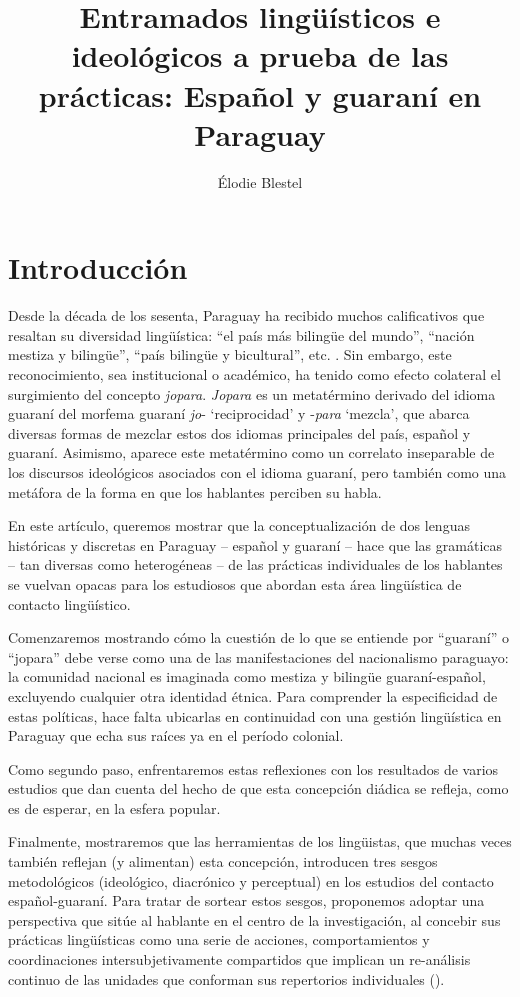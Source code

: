 \documentclass[output=paper]{langscibook}
\author{Élodie Blestel\orcid{0000-0001-7257-6859}\affiliation{Université Sorbonne Nouvelle}}
\title{Entramados lingüísticos e ideológicos a prueba de las prácticas: Español y guaraní en Paraguay}
\begin{document}
\maketitle 
{}%



\section{Introducción}


Desde la década de los sesenta, Paraguay ha recibido muchos calificativos que resaltan su diversidad lingüística: “el país más bilingüe del mundo”, “nación mestiza y bilingüe”, “país bilingüe y bicultural”, etc. \citep{Penner2014}. Sin embargo, este reconocimiento, sea institucional o académico, ha tenido como efecto colateral el surgimiento del concepto \emph {jopara}. \textit{Jopara} es un metatérmino derivado del idioma guaraní del morfema guaraní \textit{jo}{}- ‘reciprocidad’ y -\textit{para} ‘mezcla’, que abarca diversas formas de mezclar estos dos idiomas principales del país, español y guaraní. Asimismo, aparece este metatérmino como un correlato inseparable de los discursos ideológicos asociados con el idioma guaraní, pero también como una metáfora de la forma en que los hablantes perciben su habla.

En este artículo, queremos mostrar que la conceptualización de dos lenguas históricas y discretas en Paraguay -- español y guaraní -- hace que las gramáticas -- tan diversas como heterogéneas -- de las prácticas individuales de los hablantes se vuelvan opacas para los estudiosos que abordan esta área lingüística de contacto lingüístico.

Comenzaremos mostrando cómo la cuestión de lo que se entiende por “guaraní” o “jopara” debe verse como una de las manifestaciones del nacionalismo paraguayo: la comunidad nacional es imaginada como mestiza y bilingüe guaraní-español, excluyendo cualquier otra identidad étnica. Para comprender la especificidad de estas políticas, hace falta ubicarlas en continuidad con una gestión lingüística en Paraguay que echa sus raíces ya en el período colonial.

Como segundo paso, enfrentaremos estas reflexiones con los resultados de varios estudios que dan cuenta del hecho de que esta concepción diádica se refleja, como es de esperar, en la esfera popular.

Finalmente, mostraremos que las herramientas de los lingüistas, que muchas veces también reflejan (y alimentan) esta concepción, introducen tres sesgos metodológicos (ideológico, diacrónico y perceptual) en los estudios del contacto español-guaraní. Para tratar de sortear estos sesgos, proponemos adoptar una perspectiva que sitúe al hablante en el centro de la investigación, al concebir sus prácticas lingüísticas como una serie de acciones, comportamientos y coordinaciones intersubjetivamente compartidos que implican  un re-análisis continuo de las unidades que conforman sus repertorios individuales (\citealt{BlommaertBackus2011}).
\end{document}
